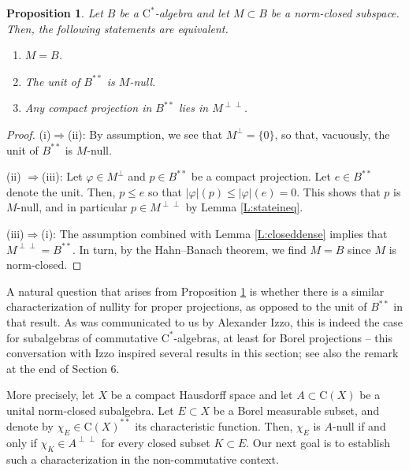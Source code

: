 \documentclass[10pt]{amsart}
\newcommand{\rC}{\mathrm{C}}
\renewcommand{\phi}{\varphi}
\newtheorem{proposition}[lemma]{Proposition}
\theoremstyle{definition}
\begin{document}
\begin{proposition}\label{P:sacriterion}
Let $B$ be a $\rC^*$-algebra and let $M\subset B$ be a norm-closed subspace. Then, the following statements are equivalent.
\begin{enumerate}[{\rm (i)}]
\item $M=B$.
\item The unit  of $B^{**}$ is $M$-null.
\item Any compact projection in $B^{**}$ lies in $M^{\perp\perp}$.
\end{enumerate}
\end{proposition}
\begin{proof}
(i)$\Rightarrow$(ii): By assumption, we see that $M^{\perp}=\{0\}$, so that, vacuously, the unit of $B^{**}$ is $M$-null.

(ii) $\Rightarrow$(iii): Let $\phi\in M^\perp$ and $p\in B^{**}$ be a 
compact projection. Let $e\in B^{**}$ denote the unit. Then, $p\leq e$ so that $|\phi|(p)\leq |\phi|(e)=0$. This shows that $p$ is $M$-null, and in particular $p\in M^{\perp\perp}$ by Lemma \ref{L:stateineq}.

(iii)$\Rightarrow$(i): The assumption combined with Lemma \ref{L:closeddense} implies that $M^{\perp\perp}=B^{**}$. In turn, by the Hahn--Banach theorem, we find $M=B$ since $M$ is norm-closed.
\end{proof}



A natural question that arises from Proposition \ref{P:sacriterion} is whether there is a similar 
characterization of nullity for proper projections, as opposed to  the unit of $B^{**}$ in that result. 
As was communicated to us by Alexander Izzo, this is indeed the case for subalgebras of commutative $\rC^*$-algebras, at least for Borel projections -- this conversation with Izzo inspired several results in this section; see also the remark at the end of Section 6.
 
 
More precisely, let $X$ be a compact Hausdorff space and let $A\subset \rC(X)$ be a unital norm-closed subalgebra. Let $E\subset X$ be a Borel measurable subset, and denote by $\chi_E\in \rC(X)^{**}$ its characteristic function. Then, $\chi_E$ is $A$-null if and only if $\chi_K\in A^{\perp\perp}$ for every closed subset $K\subset E$. 
Our next goal is to establish such a characterization  in the non-commutative context. 
\end{document}
